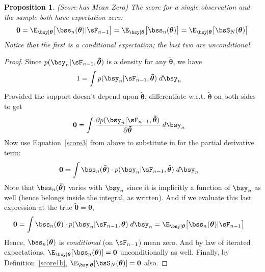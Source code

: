 \documentclass[12pt]{article}
\theoremstyle{plain}
\newtheorem{prop}[thm]{Proposition}
\theoremstyle{definition}
\theoremstyle{remark}
\newcommand{\bstheta}{\boldsymbol{\theta}}
\newcommand{\bstildetheta}{\boldsymbol{\tilde{\theta}}}
\renewcommand{\bso}{\boldsymbol{0}}
\begin{document}
\begin{prop}\emph{(Score has Mean Zero)}
\label{prop:score0}
The score for a single observation and the sample both have expectation
zero:
\begin{align*}
  \bso
  = \E_{\bsy|\bstheta}\big[\bss_n(\bstheta)|\sF_{n-1}\big]
  = \E_{\bsy|\bstheta}\big[\bss_n(\bstheta)\big]
  = \E_{\bsy|\bstheta}\big[\bsS_N(\bstheta)\big]
\end{align*}
Notice that the first is a conditional expectation;
the last two are unconditional.
\end{prop}
\begin{proof}
Since $p(\bsy_n|\sF_{n-1},\bstildetheta)$ is a density for any
$\bstildetheta$, we have
\begin{align*}
  1 &= \int p(\bsy_n|\sF_{n-1},\bstildetheta) \; d\bsy_n
\end{align*}
Provided the support doesn't depend upon $\bstildetheta$, differentiate
w.r.t. $\bstildetheta$ on both sides to get
\begin{align*}
  \bso
  &=
  \int
  \frac{\partial p(\bsy_n|\sF_{n-1},\bstildetheta)}{\partial\bstildetheta}
  \; d\bsy_n
\end{align*}
Now use Equation~\ref{score3} from above to substitute in for the
partial derivative term:
\begin{align}
  \bso &= \int
  \bss_n(\bstildetheta)\cdot p(\bsy_n|\sF_{n-1},\bstildetheta)
  \; d\bsy_n
  \label{trueonly}
\end{align}
Note that $\bss_n(\bstildetheta)$ varies with $\bsy_n$ since it is
implicitly a function of $\bsy_n$ as well (hence belongs inside the
integral, as written).
And if we evaluate this last expression at the true
$\bstildetheta=\bstheta$,
\begin{align*}
  \bso &=
  \int
  \bss_n(\bstheta)\cdot p(\bsy_n|\sF_{n-1},\bstheta)
  \; d\bsy_n
  =
  \E_{\bsy|\bstheta}\big[
    \bss_n(\bstheta)
    |\sF_{n-1}
  \big]
\end{align*}
Hence, $\bss_n(\bstheta)$ is \emph{conditional} (on $\sF_{n-1}$) mean
zero.
And by law of iterated expectations,
$\E_{\bsy|\bstheta}[\bss_n(\bstheta)]=\bso$ unconditionally as well.
Finally, by Definition~\ref{score1b},
$\E_{\bsy|\bstheta}[\bsS_N(\bstheta)]=\bso$ also.
\end{proof}
\end{document}
